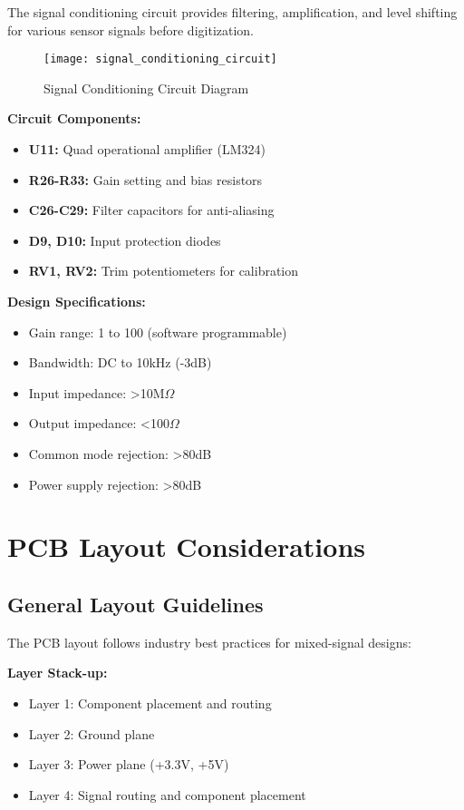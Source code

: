 The signal conditioning circuit provides filtering, amplification, and level shifting for various sensor signals before digitization.

\begin{figure}[H]
\centering
\texttt{[image: signal\_conditioning\_circuit]}
\caption{Signal Conditioning Circuit Diagram}
\label{fig:signal_conditioning_circuit}
\end{figure}

\textbf{Circuit Components:}
\begin{itemize}
\item \textbf{U11:} Quad operational amplifier (LM324)
\item \textbf{R26-R33:} Gain setting and bias resistors
\item \textbf{C26-C29:} Filter capacitors for anti-aliasing
\item \textbf{D9, D10:} Input protection diodes
\item \textbf{RV1, RV2:} Trim potentiometers for calibration
\end{itemize}

\textbf{Design Specifications:}
\begin{itemize}
\item Gain range: 1 to 100 (software programmable)
\item Bandwidth: DC to 10kHz (-3dB)
\item Input impedance: >10M$\Omega$
\item Output impedance: <100$\Omega$
\item Common mode rejection: >80dB
\item Power supply rejection: >80dB
\end{itemize}

\section{PCB Layout Considerations}
\label{sec:pcb_layout}

\subsection{General Layout Guidelines}
\label{subsec:layout_guidelines}

The PCB layout follows industry best practices for mixed-signal designs:

\textbf{Layer Stack-up:}
\begin{itemize}
\item Layer 1: Component placement and routing
\item Layer 2: Ground plane
\item Layer 3: Power plane (+3.3V, +5V)
\item Layer 4: Signal routing and component placement
\end{itemize}

